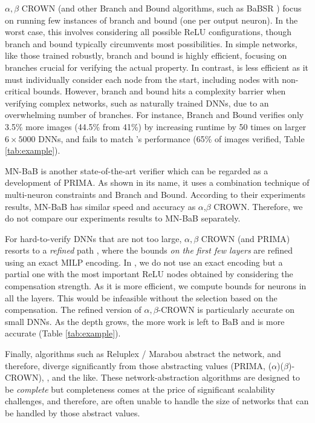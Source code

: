$\alpha,\beta$ CROWN \cite{crown} (and other Branch and Bound algorithms, such as BaBSR \cite{BaB}) focus on running few instances of branch and bound (one per output neuron).  In the worst case, this involves considering all possible ReLU configurations, though branch and bound typically circumvents most possibilities. In simple networks, like those trained robustly, branch and bound is highly efficient, focusing on branches crucial for verifying the actual property. In contrast, {\CMP} is less efficient as it must individually consider each node from the start, including nodes with non-critical bounds. However, branch and bound hits a complexity barrier when verifying complex networks, such as naturally trained DNNs, due to an overwhelming number of branches. For instance, Branch and Bound verifies only 3.5\% more images (44.5\% from 41\%) by increasing runtime by 50 times on larger $6 \times 5000$ DNNs, and fails to match {\CMP}'s performance (65\% of images verified, Table \ref{tab:example}). 

{\color{red} MN-BaB \cite{ferrari2022complete} is another state-of-the-art verifier which can be regarded as a development of PRIMA. As shown in its name, it uses a combination technique of multi-neuron constraints and Branch and Bound. According to their experiments results, MN-BaB has similar speed and accuracy as $\alpha$,$\beta$ CROWN. Therefore, we do not compare our experiments results to MN-BaB separately.}

For hard-to-verify DNNs that are not too large,  $\alpha,\beta$ CROWN (and PRIMA) resorts to a {\em refined} path \cite{MILP2}, where the bounds {\em on the first few layers} are refined using an exact MILP encoding. In {\CMP}, we do not use an exact encoding but a partial one with the most important ReLU nodes obtained by considering the compensation strength. As it is more efficient, we compute bounds for neurons in all the layers. This would be infeasible without the selection based on the compensation. The refined version of $\alpha,\beta$-CROWN is particularly accurate on small DNNs. As the depth grows, the more work is left to BaB and \CMP is more accurate (Table \ref{tab:example}).

Finally, algorithms such as Reluplex / Marabou \cite{Reluplex,katz2019marabou}  abstract the network, and therefore,  diverge significantly from those abstracting values (PRIMA, ($\alpha$)($\beta$)-CROWN)\cite{prima,crown}, {\CMP}, and the like. These network-abstraction algorithms are designed to be {\em complete} but completeness comes at the price of significant scalability challenges, and therefore, are often unable to handle the size of networks that can be handled by those abstract values. 
